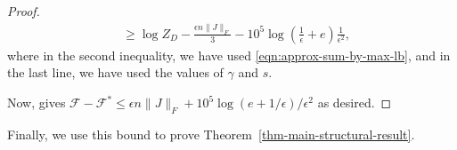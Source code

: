 \documentclass[final, 12pt]{colt2018}
\newcommand{\F}{\mathcal{F}}
\theoremstyle{definition}
\theoremstyle{plain}
\begin{document}
\begin{proof}
\begin{align*}
 & \geq \log Z_{D} - \frac{\epsilon n\|J\|_F}{3} - 10^5\log\left(\frac{1}{\epsilon} + e\right)\frac{1}{\epsilon^{2}},
\end{align*}
where in the second inequality, we have used \cref{eqn:approx-sum-by-max-lb}, and in the last line, we have used the values of $\gamma$ and $s$. 
\iffalse %
For the upper bound on $-\F^{*}_{D}$, let $\bar{x}=(\bar{x}_1,\dots,\bar{x}_n)$ attain $\F^{*}_{D}$, and let $r=(r_1,\dots,r_s),c=(c_1,\dots,c_s) \in I_{\gamma}^{s}$ be such that $\bar{x}\in X_{r,c,\gamma}$. 
Then, we have
\begin{align*}
-\F_{D}^{*} & \leq\sum_{i=1}^{n}r_{i}(\bar{x})c_{i}(\bar{x})d_{i}+O_{r,c,\gamma}\\
 & \leq\left\{ \sum_{i=1}^{n}r_{i}c_{i}d_{i}+8\|J\|_F\gamma ns\right\} +\left\{ \log|X_{r,c,2\gamma}|+20sn\exp(-2\gamma^{2}n)\right\} \\
 & =\left\{ \sum_{i=1}^{n}r_{i}c_{i}d_{i}+\log|X_{r,c,2\gamma}|\right\} +8\|J\|_F\gamma ns+20sn\exp(-2\gamma^{2}n)\\
& \leq Z_{D,\gamma,2}^{*}+8\|J\|_F\gamma ns+20sn\exp(-2\gamma^{2}n)\\
 & \leq Z_{D}+24\|J\|_F\gamma ns+20sn\exp(-2\gamma^{2}n)\\
 & \leq Z_{D}+\frac{\epsilon n\|J\|_F}{3}+10^{7}\frac{ne^{-\epsilon n/10^{7}}}{\epsilon^{2}}\\
& \leq Z_{D}+\frac{\epsilon n\|J\|_F}{3}+10^{7}\log\left(\frac{1}{\epsilon}\right)\frac{1}{\epsilon^{2}},
\end{align*}
where the first line follows from the definition of $O_{r,c,\gamma}$, the second line follows from \cref{lemma:gamma-def} and \cref{lemma:entropyapprox} (and the assumed lower bound on $n$), the fourth line follows from the definition of $Z^{*}_{D,\gamma,2}$, the fifth line follows from \cref{eqn:approx-sum-by-max-ub}, the sixth line follows from the values of $\gamma$ and $s$, and the last line follows from the assumed lower bound on $n$. 
\fi
Now,  gives
$\mathcal{F} - \mathcal{F}^* \le \epsilon n \|J\|_F + 10^5 \log(e + 1/\epsilon)/\epsilon^2$ as desired.
\end{proof}
Finally, we use this bound to prove Theorem~\ref{thm-main-structural-result}.
\end{document}
